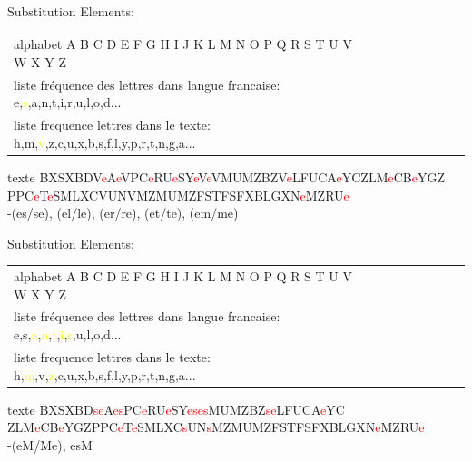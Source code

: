 \documentclass[10pt,xcolor=table]{beamer}
\begin{document}
\begin{frame}
\begin{exampleblock}{Substitution}
Elements:
\begin{tabular}{l!{\vrule}ccccccc} 
alphabet A B C D E F G H I J K L M N O P Q R S T U V W X Y Z \\   
liste fréquence des lettres dans langue francaise: e,\textcolor{yellow}{s},a,n,t,i,r,u,l,o,d... \\ 
liste frequence lettres dans le texte: h,m,\textcolor{yellow}{v},z,c,u,x,b,s,f,l,y,p,r,t,n,g,a...
\end{tabular}
\end{exampleblock}
\begin{exampleblock}{texte}
BXSXBDV\textcolor{red}{e}A\textcolor{red}{e}VPC\textcolor{red}{e}RU\textcolor{red}{e}SY\textcolor{red}{e}V\textcolor{red}{e}VMUMZBZV\textcolor{red}{e}LFUCA\textcolor{red}{e}YCZLM\textcolor{red}{e}CB\textcolor{red}{e}YGZ
PPC\textcolor{red}{e}T\textcolor{red}{e}SMLXCVUNVMZMUMZFSTFSFXBLGXN\textcolor{red}{e}MZRU\textcolor{red}{e} \\ \vspace{2\baselineskip}
-(es/se), (el/le), (er/re), (et/te), (em/me)
\end{exampleblock}
\end{frame}


\begin{frame}
\begin{exampleblock}{Substitution}
Elements:
\begin{tabular}{l!{\vrule}ccccccc} 
alphabet A B C D E F G H I J K L M N O P Q R S T U V W X Y Z \\   
liste fréquence des lettres dans langue francaise: e,s,\textcolor{yellow}{a},\textcolor{yellow}{n},\textcolor{yellow}{t},\textcolor{yellow}{i},\textcolor{yellow}{r},u,l,o,d... \\ 
liste frequence lettres dans le texte: h,\textcolor{yellow}{m},v,\textcolor{yellow}{z},c,u,x,b,s,f,l,y,p,r,t,n,g,a...
\end{tabular}
\end{exampleblock}
\begin{exampleblock}{texte}
BXSXBD\textcolor{red}{s}\textcolor{red}{e}A\textcolor{red}{e}\textcolor{red}{s}PC\textcolor{red}{e}RU\textcolor{red}{e}SY\textcolor{red}{e}\textcolor{red}{s}\textcolor{red}{e}\textcolor{red}{s}MUMZBZ\textcolor{red}{s}\textcolor{red}{e}LFUCA\textcolor{red}{e}YC
ZLM\textcolor{red}{e}CB\textcolor{red}{e}YGZPPC\textcolor{red}{e}T\textcolor{red}{e}SMLXC\textcolor{red}{s}UN\textcolor{red}{s}MZMUMZFSTFSFXBLGXN\textcolor{red}{e}MZRU\textcolor{red}{e} \\ \vspace{2\baselineskip}
-(eM/Me), esM 
\end{exampleblock}
\end{frame}
\end{document}
